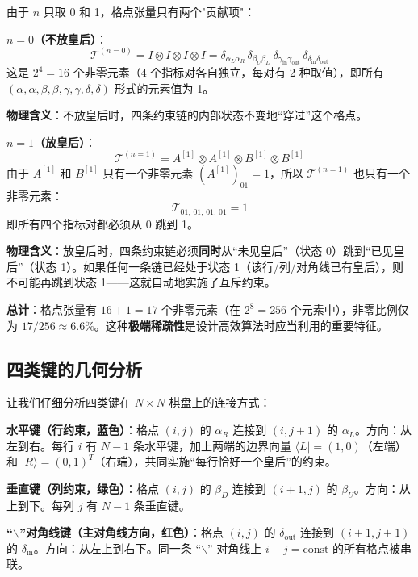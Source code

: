 \documentclass[12pt,a4paper]{ctexart}
\begin{document}
由于 $n$ 只取 0 和 1，格点张量只有两个"贡献项"：

\textbf{$n = 0$（不放皇后）}：
\begin{equation}
\mathcal{T}^{(n=0)} = I \otimes I \otimes I \otimes I = \delta_{\alpha_L \alpha_R}\, \delta_{\beta_U \beta_D}\, \delta_{\gamma_{\text{in}} \gamma_{\text{out}}}\, \delta_{\delta_{\text{in}} \delta_{\text{out}}}
\end{equation}
这是 $2^4 = 16$ 个非零元素（4 个指标对各自独立，每对有 2 种取值），即所有 $(\alpha, \alpha, \beta, \beta, \gamma, \gamma, \delta, \delta)$ 形式的元素值为 1。

\textbf{物理含义}：不放皇后时，四条约束链的内部状态不变地``穿过''这个格点。

\textbf{$n = 1$（放皇后）}：
\begin{equation}
\mathcal{T}^{(n=1)} = A^{[1]} \otimes A^{[1]} \otimes B^{[1]} \otimes B^{[1]}
\end{equation}
由于 $A^{[1]}$ 和 $B^{[1]}$ 只有一个非零元素 $(A^{[1]})_{01} = 1$，所以 $\mathcal{T}^{(n=1)}$ 也只有一个非零元素：
\begin{equation}
\mathcal{T}_{01,\, 01,\, 01,\, 01} = 1
\end{equation}
即所有四个指标对都必须从 0 跳到 1。

\textbf{物理含义}：放皇后时，四条约束链必须\textbf{同时}从``未见皇后''（状态 0）跳到``已见皇后''（状态 1）。如果任何一条链已经处于状态 1（该行/列/对角线已有皇后），则不可能再跳到状态 1——这就自动地实施了互斥约束。

\textbf{总计}：格点张量有 $16 + 1 = 17$ 个非零元素（在 $2^8 = 256$ 个元素中），非零比例仅为 $17/256 \approx 6.6\%$。这种\textbf{极端稀疏性}是设计高效算法时应当利用的重要特征。

\subsection{四类键的几何分析}

让我们仔细分析四类键在 $N \times N$ 棋盘上的连接方式：

\textbf{水平键（行约束，蓝色）}：格点 $(i,j)$ 的 $\alpha_R$ 连接到 $(i,j+1)$ 的 $\alpha_L$。方向：从左到右。每行 $i$ 有 $N-1$ 条水平键，加上两端的边界向量 $\langle L| = (1,0)$（左端）和 $|R\rangle = (0,1)^T$（右端），共同实施``每行恰好一个皇后''的约束。

\textbf{垂直键（列约束，绿色）}：格点 $(i,j)$ 的 $\beta_D$ 连接到 $(i+1,j)$ 的 $\beta_U$。方向：从上到下。每列 $j$ 有 $N-1$ 条垂直键。

\textbf{``$\backslash$''对角线键（主对角线方向，红色）}：格点 $(i,j)$ 的 $\delta_{\text{out}}$ 连接到 $(i+1,j+1)$ 的 $\delta_{\text{in}}$。方向：从左上到右下。同一条 ``$\backslash$'' 对角线上 $i - j = \text{const}$ 的所有格点被串联。
\end{document}

